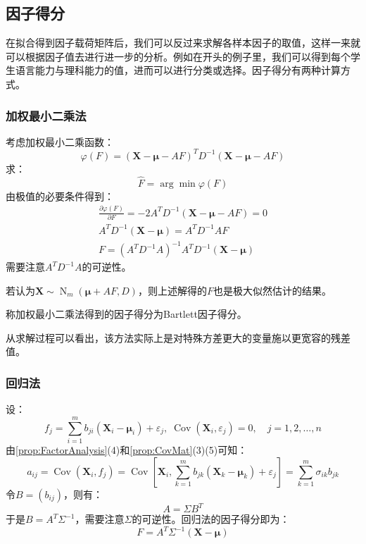 \subsection{因子得分}
在拟合得到因子载荷矩阵后，我们可以反过来求解各样本因子的取值，这样一来就可以根据因子值去进行进一步的分析。例如在开头的例子里，我们可以得到每个学生语言能力与理科能力的值，进而可以进行分类或选择。因子得分有两种计算方式。
\subsubsection{加权最小二乘法}
\begin{derivation}
	考虑加权最小二乘函数：
	\begin{equation*}
		\varphi(F)=(\mathbf{X}-\boldsymbol{\mu}-AF)^TD^{-1}(\mathbf{X}-\boldsymbol{\mu}-AF)
	\end{equation*}
	求：
	\begin{equation*}
		\hat{F}=\arg\min\varphi(F)
	\end{equation*}
	由极值的必要条件得到：
	\begin{gather*}
		\frac{\partial\varphi(F)}{\partial F}=-2A^TD^{-1}(\mathbf{X}-\boldsymbol{\mu}-AF)=0 \\
		A^TD^{-1}(\mathbf{X}-\boldsymbol{\mu})=A^TD^{-1}AF \\
		F=(A^TD^{-1}A)^{-1}A^TD^{-1}(\mathbf{X}-\boldsymbol{\mu})
	\end{gather*}
	需要注意$A^TD^{-1}A$的可逆性。\par
	若认为$\mathbf{X}\sim\operatorname{N}_m(\boldsymbol{\mu}+AF,D)$，则上述解得的$F$也是极大似然估计的结果。
\end{derivation}
\begin{definition}
	称加权最小二乘法得到的因子得分为Bartlett因子得分。
\end{definition}
从求解过程可以看出，该方法实际上是对特殊方差更大的变量施以更宽容的残差值。

\subsubsection{回归法}
\begin{derivation}
	设：
	\begin{equation*}
		f_j=\sum_{i=1}^{m}b_{ji}(\mathbf{X}_i-\boldsymbol{\mu}_i)+\varepsilon_j,\;\operatorname{Cov}(\mathbf{X}_i,\varepsilon_j)=0,\quad j=1,2,\dots,n
	\end{equation*}
	由\cref{prop:FactorAnalysis}(4)和\cref{prop:CovMat}(3)(5)可知：
	\begin{equation*}
		a_{ij}=\operatorname{Cov}(\mathbf{X}_i,f_j)=\operatorname{Cov}\left[\mathbf{X}_i,\sum_{k=1}^{m}b_{jk}(\mathbf{X}_k-\boldsymbol{\mu}_k)+\varepsilon_j\right]=\sum_{k=1}^{m}\sigma_{ik}b_{jk}
	\end{equation*}
	令$B=(b_{ij})$，则有：
	\begin{equation*}
		A=\Sigma B^T
	\end{equation*}
	于是$B=A^T\Sigma^{-1}$，需要注意$\Sigma$的可逆性。回归法的因子得分即为：
	\begin{equation*}
		F=A^T\Sigma^{-1}(\mathbf{X}-\boldsymbol{\mu})	
	\end{equation*}
\end{derivation}